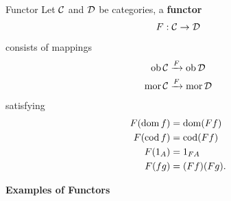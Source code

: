 \documentclass{article}
\begin{document}
\begin{fancydefine}{Functor}
Let $\mathcal{C}$ and $\mathcal{D}$ be categories, a \textbf{functor} \[ F : \mathcal{C} \to \mathcal{D}\]
consists of mappings \begin{align*}
    \operatorname{ob} \mathcal{C} &\xrightarrow[]{F} \operatorname{ob} \mathcal{D}\\
    \operatorname{mor} \mathcal{C} &\xrightarrow[]{F} \operatorname{mor} \mathcal{D}\\
\end{align*}
satisfying
\begin{align*}
    F(\operatorname{dom} f) &= \operatorname{dom} (Ff)\\
    F(\operatorname{cod} f) &= \operatorname{cod} (Ff)\\
    F(1_{A}) &= 1_{FA}\\
    F(fg) &= (Ff)(Fg).
\end{align*}
\end{fancydefine}
\exs \textbf{Examples of Functors}
\end{document}
